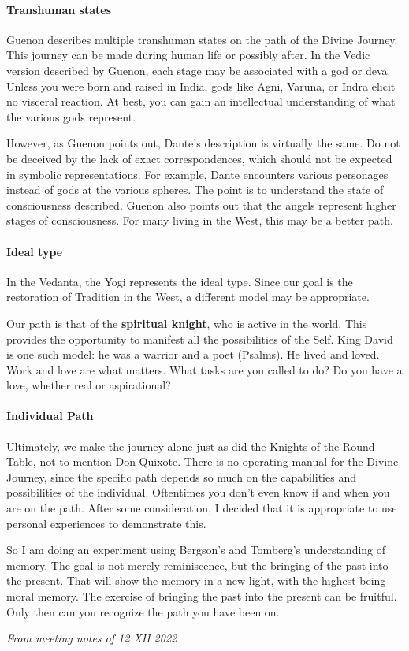 \paragraph{Transhuman states}
Guenon describes multiple transhuman states on the path of the Divine Journey. This journey can be made during human life or possibly after. In the Vedic version described by Guenon, each stage may be associated with a god or deva. Unless you were born and raised in India, gods like Agni, Varuna, or Indra elicit no visceral reaction. At best, you can gain an intellectual understanding of what the various gods represent.

However, as Guenon points out, Dante's description is virtually the same. Do not be deceived by the lack of exact correspondences, which should not be expected in symbolic representations. For example, Dante encounters various personages instead of gods at the various spheres. The point is to understand the state of consciousness described. Guenon also points out that the angels represent higher stages of consciousness. For many living in the West, this may be a better path.

\paragraph{Ideal type}
In the Vedanta, the Yogi represents the ideal type. Since our goal is the restoration of Tradition in the West, a different model may be appropriate.

Our path is that of the \textbf{spiritual knight}, who is active in the world. This provides the opportunity to manifest all the possibilities of the Self. King David is one such model: he was a warrior and a poet (Psalms). He lived and loved. Work and love are what matters. What tasks are you called to do? Do you have a love, whether real or aspirational?

\paragraph{Individual Path}
Ultimately, we make the journey alone just as did the Knights of the Round Table, not to mention Don Quixote. There is no operating manual for the Divine Journey, since the specific path depends so much on the capabilities and possibilities of the individual. Oftentimes you don't even know if and when you are on the path. After some consideration, I decided that it is appropriate to use personal experiences to demonstrate this.

So I am doing an experiment using Bergson's and Tomberg's understanding of memory. The goal is not merely reminiscence, but the bringing of the past into the present. That will show the memory in a new light, with the highest being moral memory. The exercise of bringing the past into the present can be fruitful. Only then can you recognize the path you have been on.


\textit{From meeting notes of 12 XII 2022}

